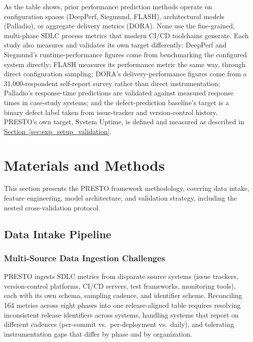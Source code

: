 \documentclass[technologies,article,submit,pdftex,moreauthors]{Definitions/mdpi}
\begin{document}
As the table shows, prior performance prediction methods operate on configuration spaces (DeepPerf, Siegmund, FLASH), architectural models (Palladio), or aggregate delivery metrics (DORA). None use the fine-grained, multi-phase SDLC process metrics that modern CI/CD toolchains generate. Each study also measures and validates its own target differently: DeepPerf and Siegmund's runtime-performance figures come from benchmarking the configured system directly; FLASH measures its performance metric the same way, through direct configuration sampling; DORA's delivery-performance figures come from a 31,000-respondent self-report survey rather than direct instrumentation; Palladio's response-time predictions are validated against measured response times in case-study systems; and the defect-prediction baseline's target is a binary defect label taken from issue-tracker and version-control history. PRESTO's own target, System Uptime, is defined and measured as described in \hyperref[sec:exp_setup_validation]{Section~\ref*{sec:exp_setup_validation}}.

\section{Materials and Methods}\label{sec:methodology}

This section presents the PRESTO framework methodology, covering data intake, feature engineering, model architecture, and validation strategy, including the nested cross-validation protocol.

\subsection{Data Intake Pipeline}\label{sec:data_intake}

\subsubsection{Multi-Source Data Ingestion Challenges}\label{sec:ingestion_challenges}

PRESTO ingests SDLC metrics from disparate source systems (issue trackers, version-control platforms, CI/CD servers, test frameworks, monitoring tools), each with its own schema, sampling cadence, and identifier scheme. Reconciling 164 metrics across eight phases into one release-aligned table requires resolving inconsistent release identifiers across systems, handling systems that report on different cadences (per-commit vs.~per-deployment vs.~daily), and tolerating instrumentation gaps that differ by phase and by organization.
\end{document}

